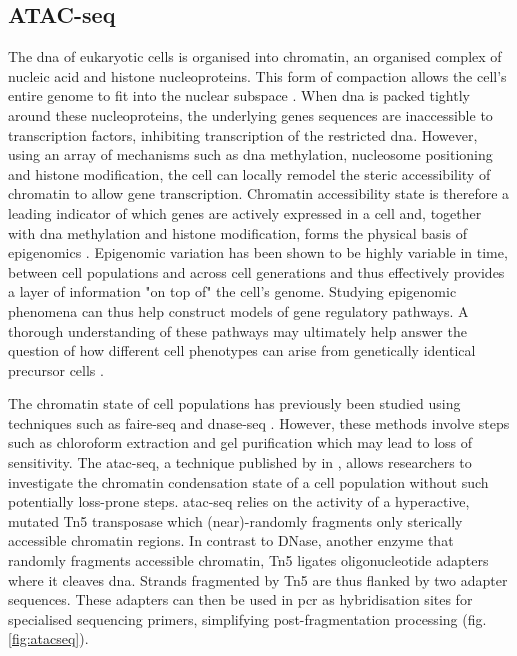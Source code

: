 \newpage
\subsection{ATAC-seq}
\label{subsect:lit_atac-seq}
The \acrshort{dna} of eukaryotic cells is organised into chromatin, an organised complex of nucleic acid and histone nucleoproteins. This form of compaction allows the cell's entire genome to fit into the nuclear subspace \citep{kornberg1974}. When \acrshort{dna} is packed tightly around these nucleoproteins, the underlying genes sequences are inaccessible to transcription factors, inhibiting transcription of the restricted \acrshort{dna}. However, using an array of mechanisms such as \acrshort{dna} methylation, nucleosome positioning and histone modification, the cell can locally remodel the steric accessibility of chromatin to allow gene transcription. Chromatin accessibility state is therefore a leading indicator of which genes are actively expressed in a cell and, together with \acrshort{dna} methylation and histone modification, forms the physical basis of epigenomics \citep{jaenisch2003, kouzarides2007, schones2008, bannister2011}. Epigenomic variation has been shown to be highly variable in time, between cell populations and across cell generations and thus effectively provides a layer of information "on top of" the cell's genome. Studying epigenomic phenomena can thus help construct models of gene regulatory pathways. A thorough understanding of these pathways may ultimately help answer the question of how different cell phenotypes can arise from genetically identical precursor cells \citep{johannes2008}.\pms

The chromatin state of cell populations has previously been studied using techniques such as \acrshort{faire-seq} and \acrshort{dnase-seq}  \citep{giresi2007, song2010, gaulton2010, song2011}. However, these methods involve steps such as chloroform extraction and gel purification which may lead to loss of sensitivity. The \acrfull{atac-seq}, a technique published by \citeauthor{buenrostro2013} in \citeyear{buenrostro2013}, allows researchers to investigate the chromatin condensation state of a cell population without such potentially loss-prone steps. \acrshort{atac-seq} relies on the activity of a hyperactive, mutated Tn5 transposase which (near)-randomly fragments only sterically accessible chromatin regions. In contrast to DNase, another enzyme that randomly fragments accessible chromatin, Tn5 ligates oligonucleotide adapters where it cleaves \acrshort{dna}. Strands fragmented by Tn5 are thus flanked by two adapter sequences. These adapters can then be used in \acrshort{pcr} as hybridisation sites for specialised sequencing primers, simplifying post-fragmentation processing (fig. \ref{fig:atacseq}).\pms

